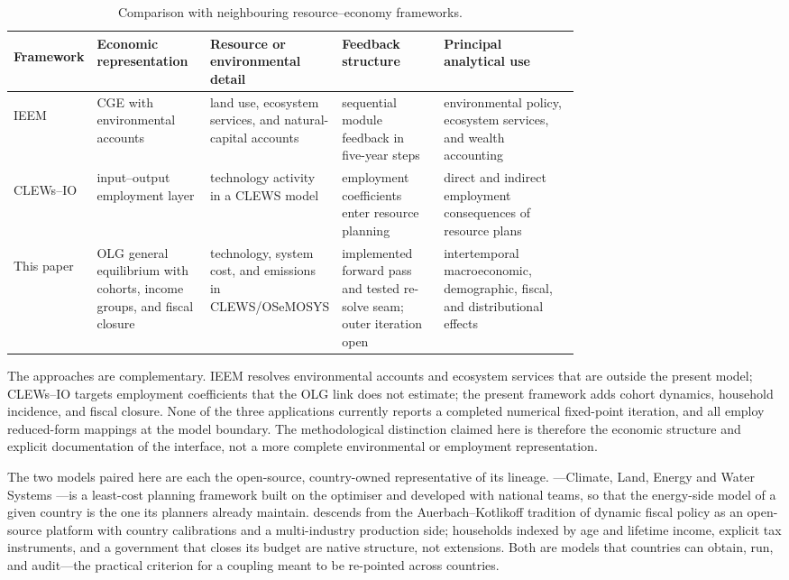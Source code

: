 \begin{table}[t]
\centering\scriptsize
\caption{Comparison with neighbouring resource--economy frameworks.}
\label{tab:comparison}
\begin{tabularx}{\linewidth}{@{}>{\bfseries\raggedright\arraybackslash}p{0.12\linewidth} >{\raggedright\arraybackslash}p{0.20\linewidth} >{\raggedright\arraybackslash}p{0.23\linewidth} >{\raggedright\arraybackslash}p{0.18\linewidth} L@{}}
\toprule
Framework & Economic representation & Resource or environmental detail & Feedback structure & Principal analytical use \\
\midrule
IEEM & CGE with environmental accounts & land use, ecosystem services, and natural-capital accounts & sequential module feedback in five-year steps & environmental policy, ecosystem services, and wealth accounting \\
CLEWs--IO & input--output employment layer & technology activity in a CLEWS model & employment coefficients enter resource planning & direct and indirect employment consequences of resource plans \\
This paper & OLG general equilibrium with cohorts, income groups, and fiscal closure & technology, system cost, and emissions in CLEWS/OSeMOSYS & implemented forward pass and tested re-solve seam; outer iteration open & intertemporal macroeconomic, demographic, fiscal, and distributional effects \\
\bottomrule
\end{tabularx}
\end{table}

The approaches are complementary. IEEM resolves environmental accounts and ecosystem
services that are outside the present model; CLEWs--IO targets employment coefficients
that the OLG link does not estimate; the present framework adds cohort dynamics,
household incidence, and fiscal closure. None of the three applications currently reports
a completed numerical fixed-point iteration, and all employ reduced-form mappings at the
model boundary. The methodological distinction claimed here is therefore the economic
structure and explicit documentation of the interface, not a more complete environmental
or employment representation.

The two models paired here are each the open-source, country-owned representative of
its lineage. \CLEWS{}---Climate, Land, Energy and Water Systems
\citep{howells_clews_2013}---is a least-cost planning framework built on the
\OSeMOSYS{} optimiser \citep{howells_osemosys_2011} and developed with national
teams, so that the energy-side model of a given country is the one its planners
already maintain. \OGCore{} \citep{debacker_evans_ogcore} descends from the
Auerbach--Kotlikoff tradition of dynamic fiscal policy \citep{auerbach_kotlikoff_1987}
as an open-source platform with country calibrations and a multi-industry
production side; households indexed by age and lifetime income, explicit tax
instruments, and a government that closes its budget are native structure, not
extensions. Both are models that countries can obtain, run, and audit---the
practical criterion for a coupling meant to be re-pointed across countries.

